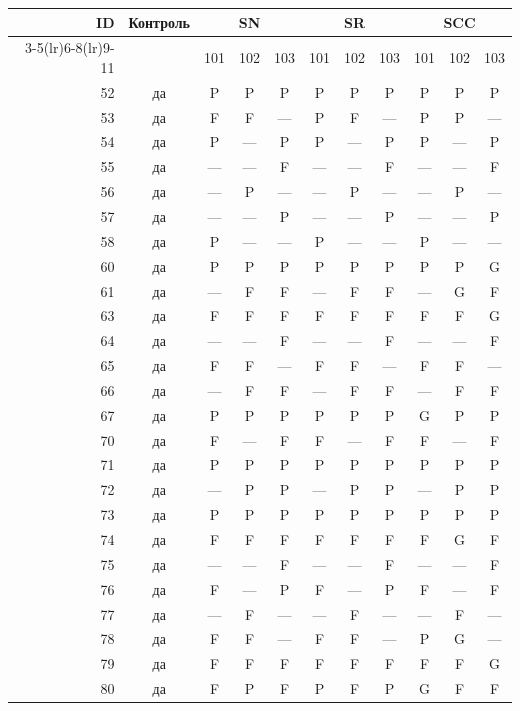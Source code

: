 \begin{table}[p]\centering\small
\begin{tabular*}{\textwidth}{@{\extracolsep{\fill}}rc*{9}{c}@{}}\toprule
ID & Контроль & \multicolumn{3}{c}{SN} & \multicolumn{3}{c}{SR} & \multicolumn{3}{c}{SCC}\\
\cmidrule(lr){3-5}\cmidrule(lr){6-8}\cmidrule(lr){9-11}
 & & 101 & 102 & 103 & 101 & 102 & 103 & 101 & 102 & 103\\\midrule
52 & да & P & P & P & P & P & P & P & P & P\\
53 & да & F & F & — & P & F & — & P & P & —\\
54 & да & P & — & P & P & — & P & P & — & P\\
55 & да & — & — & F & — & — & F & — & — & F\\
56 & да & — & P & — & — & P & — & — & P & —\\
57 & да & — & — & P & — & — & P & — & — & P\\
58 & да & P & — & — & P & — & — & P & — & —\\
60 & да & P & P & P & P & P & P & P & P & G\\
61 & да & — & F & F & — & F & F & — & G & F\\
63 & да & F & F & F & F & F & F & F & F & G\\
64 & да & — & — & F & — & — & F & — & — & F\\
65 & да & F & F & — & F & F & — & F & F & —\\
66 & да & — & F & F & — & F & F & — & F & F\\
67 & да & P & P & P & P & P & P & G & P & P\\
70 & да & F & — & F & F & — & F & F & — & F\\
71 & да & P & P & P & P & P & P & P & P & P\\
72 & да & — & P & P & — & P & P & — & P & P\\
73 & да & P & P & P & P & P & P & P & P & P\\
74 & да & F & F & F & F & F & F & F & G & F\\
75 & да & — & — & F & — & — & F & — & — & F\\
76 & да & F & — & P & F & — & P & F & — & F\\
77 & да & — & F & — & — & F & — & — & F & —\\
78 & да & F & F & — & F & F & — & P & G & —\\
79 & да & F & F & F & F & F & F & F & F & G\\
80 & да & F & P & F & P & F & P & G & F & F\\

\end{tabular*}
\end{table}
